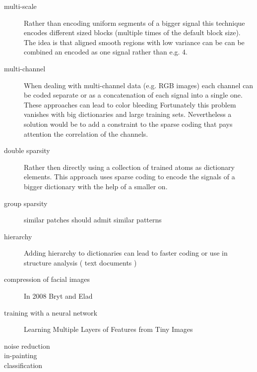 \begin{description}
\item[multi-scale]
Rather than encoding uniform segments of a bigger signal this technique encodes different sized 
blocks (multiple times of the default block size). The idea is that aligned smooth regions with low variance can be 
can be combined an encoded as one signal rather than e.g. 4. \cite{saprio}

\item[multi-channel]
When dealing with multi-channel data (e.g. RGB images) 
each channel can be coded separate or as a concatenation of each signal into a single one.
These approaches can lead to color bleeding \cite{mairal08sparse} 
Fortunately this problem vanishes with big dictionaries and large training sets. \cite{mairal08sparse}
Nevertheless a solution would be to add a constraint to the sparse coding that pays attention the correlation of the channels.

\item[double sparsity]
Rather then directly using a collection of trained atoms as dictionary elements. This approach uses sparse coding
to encode the signals of a bigger dictionary with the help of a smaller on. \cite{double sparsity} 

\item[group sparsity]
similar patches should admit similar patterns
\cite{double sparsity}

\item[hierarchy]
Adding hierarchy to dictionaries can lead to faster coding or use in structure analysis ( text documents )
\cite{Jenatton2010}

\end{description}



\begin{description}
\item[compression of facial images] In 2008 Bryt and Elad \cite{Bryt2008} 
\item[training with a neural network]
Learning Multiple Layers of Features from Tiny Images \cite{Krizhevsky2009}
\item[noise reduction]
\item[in-painting]
\item[classification] 
\end{description}





